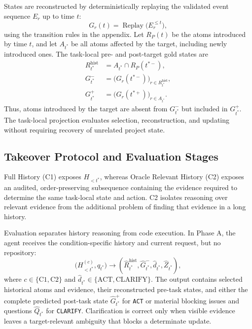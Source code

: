 \documentclass{article} %
\begin{document}
States are reconstructed by deterministically replaying the validated event sequence $E_r$ up to time $t$:
\begin{equation}
G_r(t)=\operatorname{Replay}\bigl(E_r^{\leq t}\bigr),
\label{eq:event-replay}
\end{equation}
using the transition rules in the appendix. Let $R_P(t)$ be the atoms introduced by time $t$, and let $A_{t^*}$ be all atoms affected by the target, including newly introduced ones. The task-local pre- and post-target gold states are
\begin{equation}
\begin{aligned}
R^{\mathrm{hist}}_{t^*}
    &= A_{t^*}\cap R_P(t^{*-}), \\
G^-_{t^*}
    &= \bigl(G_r(t^{*-})\bigr)_{r\in R^{\mathrm{hist}}_{t^*}}, \\
G^+_{t^*}
    &= \bigl(G_r(t^{*+})\bigr)_{r\in A_{t^*}}.
\end{aligned}
\label{eq:pre-task-gold}
\end{equation}
Thus, atoms introduced by the target are absent from $G^-_{t^*}$ but included in $G^+_{t^*}$. The task-local projection evaluates selection, reconstruction, and updating without requiring recovery of unrelated project state.

\subsection{Takeover Protocol and Evaluation Stages}
\label{sec:takeover-protocol}

Full History (C1) exposes $H_{<t^*}$, whereas Oracle Relevant History (C2) exposes an audited, order-preserving subsequence containing the evidence required to determine the same task-local state and action. C2 isolates reasoning over relevant evidence from the additional problem of finding that evidence in a long history.

Evaluation separates history reasoning from code execution. In Phase A, the agent receives the condition-specific history and current request, but no repository:
\begin{equation}
\bigl(H^{(c)}_{<t^*},q_{t^*}\bigr)
\longrightarrow
\left(
\widehat{R}^{\mathrm{hist}}_{t^*},
\widehat{G}^{-}_{t^*},
\widehat{d}_{t^*},
\widehat{Z}_{t^*}
\right),
\label{eq:phase-a}
\end{equation}
where $c\in\{\mathrm{C1},\mathrm{C2}\}$ and $\widehat{d}_{t^*}\in\{\mathrm{ACT},\mathrm{CLARIFY}\}$. The output contains selected historical atoms and evidence, their reconstructed pre-task states, and either the complete predicted post-task state $\widehat{G}^{+}_{t^*}$ for \texttt{ACT} or material blocking issues and questions $\widehat{Q}_{t^*}$ for \texttt{CLARIFY}. Clarification is correct only when visible evidence leaves a target-relevant ambiguity that blocks a determinate update.
\end{document}
